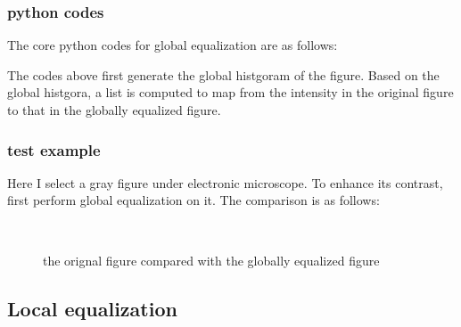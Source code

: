 \documentclass{article}
\begin{document}
\subsubsection{python codes}
    The core python codes for global equalization are as follows:
     
    
    The codes above first generate the global histgoram of the figure.
    Based on the global histgora, a list is computed to map from the intensity in the original
    figure to that in the globally equalized figure.
\subsubsection{test example}
    Here I select a gray figure under electronic microscope. To enhance its contrast, 
    first perform global equalization on it. The comparison is as follows:
    \begin{figure}[H]
        \centering
        \label{elec}
        \,    %
        \caption{the orignal figure compared with the globally equalized figure}
    \end{figure}

\subsection{Local equalization}
\end{document}
